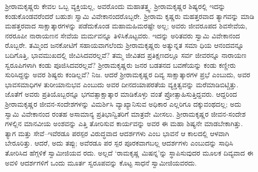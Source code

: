 ಶ್ರೀರಾಮಕೃಷ್ಣರು ಕೇವಲ ಒಬ್ಬ ವ್ಯಕ್ತಿಯಲ್ಲ, ಅವರೊಂದು ಮಹಾತತ್ತ್ವ. ಶ್ರೀರಾಮಕೃಷ್ಣರ ಶಿಷ್ಯರಲ್ಲಿ ಇದನ್ನು ಕಂಡುಕೊಂಡವರೆಂದರೆ ಬಹುಶಃ ಸ್ವಾಮಿ ವಿವೇಕಾನಂದರೊಬ್ಬರೇ. ಶ್ರೀರಾಮ ಕೃಷ್ಣರು ಮಹತ್ತರವಾದ ತ್ಯಾಗವನ್ನು ಮಾಡಿ ಮಹತ್ತರವಾದ ಸಾಕ್ಷಾತ್ಕಾರಗಳನ್ನು ಪಡೆದುಕೊಂಡ ಮಹಾಮಹಿಮರಷ್ಟೇ ಅಲ್ಲ; ಅವರು ಜೀವರೂಪದ ಶಿವಸೇವೆಯ, ನರರೂಪೀ ನಾರಾಯಣನ ಸೇವೆಯ ಮರ್ಮವನ್ನೂ ತಿಳಿಸಿಕೊಟ್ಟವರು. ಇದನ್ನು ಅರಿತವರು ಸ್ವಾಮಿ ವಿವೇಕಾನಂದ ರೊಬ್ಬರೇ. ತಮ್ಮಿಂದ ಜನಕೋಟಿಗೆ ಸಹಾಯವಾಗಲೆಂದು ಶ್ರೀರಾಮಕೃಷ್ಣರು ಅತ್ಯುನ್ನತ ಸಮಾ ಧಿಯ ಆನಂದವನ್ನೂ ಬದಿಗೊತ್ತಿ, ಭಾವಮುಖದಲ್ಲಿ ಜೀವಿಸಿದವರಲ್ಲವೆ? ತಮ್ಮ ಜೀವಿತದ ಪ್ರತಿಕ್ಷಣದಲ್ಲೂ ಸರ್ವ ಜೀವರನ್ನೂ ನಾರಾಯಣ ಸ್ವರೂಪಿಗಳಾಗಿ ಕಂಡು ಪೂಜಿಸಿದವರಲ್ಲವೆ? ಶ್ರೀರಾಮಕೃಷ್ಣರು ಜನರ ಬಡತನದ ಬವಣೆಯನ್ನು ಕಂಡು ಕಣ್ಣೀರು ಸುರಿಸಿದ್ದನ್ನು ಅವರ ಶಿಷ್ಯರು ಕಂಡಿಲ್ಲವೆ? ನಿಜ. ಆದರೆ ಶ್ರೀರಾಮಕೃಷ್ಣರ ದಿವ್ಯ ಸಾಕ್ಷಾತ್ಕಾರಗಳ ಪ್ರಭೆ ಎಂಬುದು, ಅವರ ಭಾವಸಮಾಧಿಗಳ ತುರೀಯಾನುಭವ ಎಂಬುದು ಅವರ ದೀನದಯಾಪರತೆಯ ವ್ಯಕ್ತಿತ್ವವನ್ನು ಮರೆಮಾಡಿಬಿಟ್ಚಿತ್ತು. ಜೊತೆಗೆ ಅವರು ಪ್ರತಿಯೊಬ್ಬರನ್ನೂ ಭಗವತ್ಸಾಕ್ಷಾತ್ಕಾರ ಮಾಡಿಕೊಳ್ಳು ವಂತೆ ಪ್ರೋತ್ಸಾಹಿಸುತ್ತಿದ್ದವರು. ಆದ್ದರಿಂದ ಶ್ರೀರಾಮಕೃಷ್ಣರ ಜೀವನ-ಸಂದೇಶಗಳನ್ನು ವಿಮರ್ಶಿಸಿ ವ್ಯಾಖ್ಯಾನಿಸುವ ಅಧಿಕಾರ ಎಲ್ಲರಿಗೂ ದಕ್ಕುವಂಥದಲ್ಲ; ಅದು ಸ್ವಾಮಿ ವಿವೇಕಾನಂದ ರಂತಹ ಅಸಾಮಾನ್ಯ ಪ್ರತಿಭಾನ್ವಿತರಿಗೆ ಮಾತ್ರವೇ ಮೀಸಲು. ಶ್ರೀರಾಮಕೃಷ್ಣರ ಜೀವನ-ಸಂದೇಶ ಗಳಲ್ಲಿನ ಮಾನವೀಯ ಅಂಶವನ್ನು ಎತ್ತಿ ತೋರಿಸುವ ಕಾರ್ಯವನ್ನು ಅವರ ಈ ಮಹಾ ಶಿಷ್ಯನೇ ಮಾಡಬೇಕಾಗಿತ್ತು. ತ್ಯಾಗ ಮತ್ತು ಸೇವೆ–ಇವೆರಡೂ ಪರಸ್ಪರ ವಿರುದ್ಧವಾದ ಆದರ್ಶಗಳು ಎಂಬ ಭಾವನೆ ಆ ಕಾಲದಲ್ಲಿ ಆಳವಾಗಿ ಬೇರೂರಿತ್ತು. ಆದರೆ, ಅದು ತಪ್ಪು; ಅವೆರಡೂ ಪರ ಸ್ಪರ ಪೂರಕವಾಗಬಲ್ಲ ಆದರ್ಶಗಳು ಎಂಬುದನ್ನು ಸಾಧಿಸಿ ತೋರಿಸಿದ ಹೆಗ್ಗಳಿಕೆ ಸ್ವಾಮೀಜಿಯವ ರದು. ಅಲ್ಲದೆ ‘ರಾಮಕೃಷ್ಣ ಮಿಷನ್ನ’ನ್ನು ಸ್ಥಾಪಿಸುವುದರ ಮೂಲಕ ದಿವ್ಯವಾದ ಈ ಅವಳಿ ಆದರ್ಶಗಳಿಗೆ ಒಂದು ಮೂರ್ತ ಸ್ವರೂಪವನ್ನು ಕೊಟ್ಟ ಸಾಧನೆ ಸ್ವಾಮೀಜಿಯವರದು.


